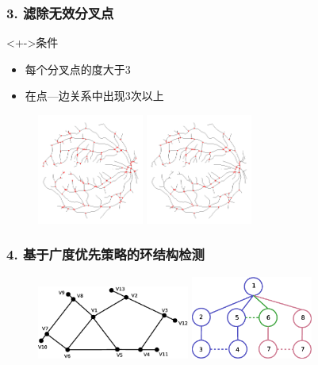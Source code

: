 \documentclass[notheorems,mathserif,table,compress]{beamer}  %
\begin{document}
\begin{frame}
\frametitle{3. 滤除无效分叉点}
\begin{block}<+->{条件}
\begin{itemize}
\item 每个分叉点的度大于3\\
\item 在点---边关系中出现3次以上
\end{itemize}
\end{block}
\begin{figure}
\centering
  \begin{minipage}[b]{0.33\textwidth} 
      \centering 
      \includegraphics[width=3.5cm]{chap02/all-bifu}
    \end{minipage}
  \begin{minipage}[b]{0.33\textwidth}
    \centering
    \includegraphics[width=3.5cm]{chap02/select-bifu}
  \end{minipage}
\caption*{\color{blue}{所有分叉点与滤除无效分叉点后的对比图}}
\end{figure}
\end{frame}

\begin{frame}
\frametitle{4. 基于广度优先策略的环结构检测}
\begin{figure}
\centering
  \begin{minipage}[b]{0.48\textwidth} 
      \centering 
       \includegraphics[width=5cm]{chap02/graph2}
    \end{minipage}
  \begin{minipage}[b]{0.48\textwidth}
    \centering
    \includegraphics[width=4cm]{chap02/tree}
  \end{minipage}
\caption*{\color{blue}{图与搜索树}}
\end{figure}
\end{frame}
\end{document}
